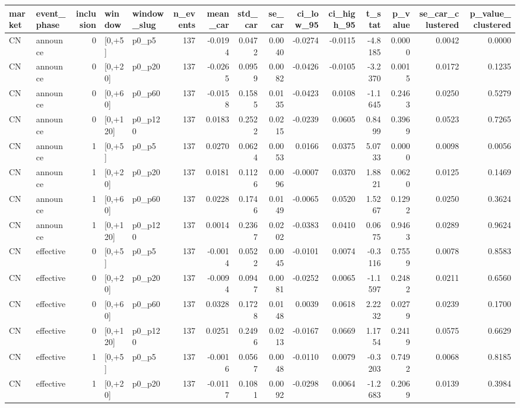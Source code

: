 \begin{tabular}{llrllrrrrrrrrrr}
\toprule
market & event_phase & inclusion & window & window_slug & n_events & mean_car & std_car & se_car & ci_low_95 & ci_high_95 & t_stat & p_value & se_car_clustered & p_value_clustered \\
\midrule
CN & announce & 0 & [0,+5] & p0_p5 & 137 & -0.0194 & 0.0472 & 0.0040 & -0.0274 & -0.0115 & -4.8185 & 0.0000 & 0.0042 & 0.0000 \\
CN & announce & 0 & [0,+20] & p0_p20 & 137 & -0.0265 & 0.0959 & 0.0082 & -0.0426 & -0.0105 & -3.2370 & 0.0015 & 0.0172 & 0.1235 \\
CN & announce & 0 & [0,+60] & p0_p60 & 137 & -0.0158 & 0.1585 & 0.0135 & -0.0423 & 0.0108 & -1.1645 & 0.2463 & 0.0250 & 0.5279 \\
CN & announce & 0 & [0,+120] & p0_p120 & 137 & 0.0183 & 0.2522 & 0.0215 & -0.0239 & 0.0605 & 0.8499 & 0.3969 & 0.0523 & 0.7265 \\
CN & announce & 1 & [0,+5] & p0_p5 & 137 & 0.0270 & 0.0624 & 0.0053 & 0.0166 & 0.0375 & 5.0733 & 0.0000 & 0.0098 & 0.0056 \\
CN & announce & 1 & [0,+20] & p0_p20 & 137 & 0.0181 & 0.1126 & 0.0096 & -0.0007 & 0.0370 & 1.8821 & 0.0620 & 0.0125 & 0.1469 \\
CN & announce & 1 & [0,+60] & p0_p60 & 137 & 0.0228 & 0.1746 & 0.0149 & -0.0065 & 0.0520 & 1.5267 & 0.1292 & 0.0250 & 0.3624 \\
CN & announce & 1 & [0,+120] & p0_p120 & 137 & 0.0014 & 0.2367 & 0.0202 & -0.0383 & 0.0410 & 0.0675 & 0.9463 & 0.0289 & 0.9624 \\
CN & effective & 0 & [0,+5] & p0_p5 & 137 & -0.0014 & 0.0522 & 0.0045 & -0.0101 & 0.0074 & -0.3116 & 0.7559 & 0.0078 & 0.8583 \\
CN & effective & 0 & [0,+20] & p0_p20 & 137 & -0.0094 & 0.0947 & 0.0081 & -0.0252 & 0.0065 & -1.1597 & 0.2482 & 0.0211 & 0.6560 \\
CN & effective & 0 & [0,+60] & p0_p60 & 137 & 0.0328 & 0.1728 & 0.0148 & 0.0039 & 0.0618 & 2.2232 & 0.0279 & 0.0239 & 0.1700 \\
CN & effective & 0 & [0,+120] & p0_p120 & 137 & 0.0251 & 0.2496 & 0.0213 & -0.0167 & 0.0669 & 1.1754 & 0.2419 & 0.0575 & 0.6629 \\
CN & effective & 1 & [0,+5] & p0_p5 & 137 & -0.0016 & 0.0567 & 0.0048 & -0.0110 & 0.0079 & -0.3203 & 0.7492 & 0.0068 & 0.8185 \\
CN & effective & 1 & [0,+20] & p0_p20 & 137 & -0.0117 & 0.1081 & 0.0092 & -0.0298 & 0.0064 & -1.2683 & 0.2069 & 0.0139 & 0.3984 \\

\end{tabular}
